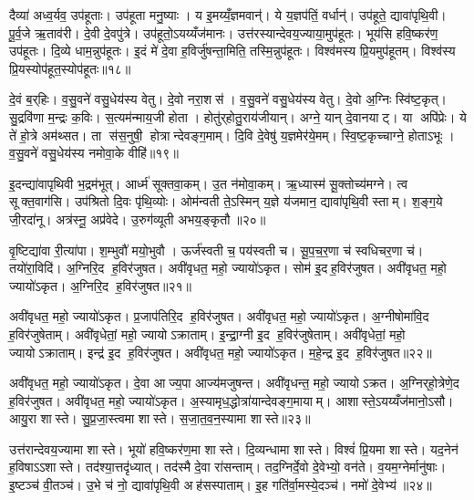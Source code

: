दैव्या॑ अध्व॒र्यव॒ उप॑हूताः। उप॑हूता मनु॒ष्याः। य इ॒मय्यँ॒ज्ञमवान्॑। ये य॒ज्ञप॑तिं॒ वर्धान्॑। उप॑हूते॒ द्यावा॑पृथि॒वी। पू॒र्व॒जे ऋ॒ताव॑री। दे॒वी दे॒वपु॑त्रे। उप॑हूतो॒ऽयय्यँज॑मानः। उत्त॑रस्यान्देवय॒ज्याया॒मुप॑हूतः। भूय॑सि हवि॒ष्कर॑ण॒ उप॑हूतः। दि॒व्ये धाम॒न्नुप॑हूतः। इ॒दं मे॑ दे॒वा ह॒विर्जु॑षन्ता॒मिति॒ तस्मि॒न्नुप॑हूतः। विश्व॑मस्य प्रि॒यमुप॑हूतम्। विश्व॑स्य प्रि॒यस्योप॑हूत॒स्योप॑हूतः॥१८॥\anuvakamend[स॒हर्‌ष॑भा ह्वयता॒मुप॑हूत हवि॒ष्कर॑ण॒ उप॑हूतश्च॒त्वारि॑ च]

दे॒वं ब॒र्‌हिः। व॒सु॒वने॑ वसु॒धेय॑स्य वेतु। दे॒वो नरा॒शस॑। व॒सु॒वने॑ वसु॒धेय॑स्य वेतु। दे॒वो अ॒ग्निः स्वि॑ष्ट॒कृत्। सु॒द्रवि॑णा म॒न्द्रः क॒विः। स॒त्यम॑न्माय॒जी होता। होतु॑र्‌होतु॒राय॑जीयान्। अग्ने॒ यान् दे॒वानयाट्। या अपि॑प्रेः। ये ते॑ हो॒त्रे अम॑थ्सत। ता स॑स॒नुषी॒ होत्रान्देवङ्ग॒माम्। दि॒वि दे॒वेषु॑ य॒ज्ञमेर॑ये॒मम्। स्वि॒ष्ट॒कृच्चाग्ने॒ होताऽभूः। व॒सु॒वने॑ वसु॒धेय॑स्य नमोवा॒के वीहि॑॥१९॥\anuvakamend[अपि॑प्रे॒ पञ्च॑ च]

इ॒दन्द्या॑वापृथिवी भ॒द्रम॑भूत्। आर्ध्म॑ सूक्तवा॒कम्। उ॒त न॑मोवा॒कम्। ऋ॒ध्यास्म॑ सू॒क्तोच्य॑मग्ने। त्व सूक्त॒वाग॑सि। उप॑श्रितो दि॒वः पृ॑थि॒व्योः। ओम॑न्वती ते॒ऽस्मिन् य॒ज्ञे य॑जमान॒ द्यावा॑पृथि॒वी स्ताम्। श॒ङ्ग॒ये जी॒रदा॑नू। अत्र॑स्नू॒ अप्र॑वेदे। उ॒रुग॑व्यूती अभय॒ङ्कृतौ॥२०॥

वृ॒ष्टिद्या॑वा री॒त्या॑पा। श॒म्भुवौ॑ मयो॒भुवौ। ऊर्ज॑स्वती च॒ पय॑स्वती च। सू॒प॒च॒र॒णा च॑ स्वधिचर॒णा च॑। तयो॑रा॒विदि॑। अ॒ग्निरि॒द ह॒विर॑जुषत। अवी॑वृधत॒ महो॒ ज्यायो॑ऽकृत। सोम॑ इ॒दह॒विर॑जुषत। अवी॑वृधत॒ महो॒ ज्यायो॑ऽकृत। अ॒ग्निरि॒द ह॒विर॑जुषत॥२१॥

अवी॑वृधत॒ महो॒ ज्यायो॑ऽकृत। प्र॒जाप॑तिरि॒द ह॒विर॑जुषत। अवी॑वृधत॒ महो॒ ज्यायो॑ऽकृत। अ॒ग्नीषोमा॑वि॒द ह॒विर॑जुषेताम्। अवी॑वृधेतां॒ महो॒ ज्यायोऽक्राताम्। इ॒न्द्रा॒ग्नी इ॒द ह॒विर॑जुषेताम्। अवी॑वृधेतां॒ महो॒ ज्यायोऽक्राताम्। इन्द्र॑ इ॒द ह॒विर॑जुषत। अवी॑वृधत॒ महो॒ ज्यायो॑ऽकृत। म॒हे॒न्द्र इ॒द ह॒विर॑जुषत॥२२॥

अवी॑वृधत॒ महो॒ ज्यायो॑ऽकृत। दे॒वा आज्य॒पा आज्य॑मजुषन्त। अवी॑वृधन्त॒ महो॒ ज्यायोऽक्रत। अ॒ग्निर्‌हो॒त्रेणे॒द ह॒विर॑जुषत। अवी॑वृधत॒ महो॒ ज्यायो॑ऽकृत। अ॒स्यामृध॒द्धोत्रा॑यान्देवङ्ग॒मायाम्। आशास्ते॒ऽयय्यँज॑मानो॒ऽसौ। आयु॒रा शास्ते। सु॒प्र॒जा॒स्त्वमा शास्ते। स॒जा॒त॒व॒न॒स्यामा शास्ते॥२३॥

उत्त॑रान्देवय॒ज्यामा शास्ते। भूयो॑ हवि॒ष्कर॑ण॒मा शास्ते। दि॒व्यन्धामा शास्ते। विश्वं॑ प्रि॒यमा शास्ते। यद॒नेन॑ ह॒विषाऽऽशास्ते। तद॑श्या॒त्तदृ॑ध्यात्। तद॑स्मै दे॒वा रा॑सन्ताम्। तद॒ग्निर्दे॒वो दे॒वेभ्यो॒ वन॑ते। व॒यम॒ग्नेर्मानु॑षाः। इ॒ष्टञ्च॑ वी॒तञ्च॑। उ॒भे च॑ नो॒ द्यावा॑पृथि॒वी अह॑सस्पाताम्। इ॒ह गति॑र्वा॒मस्ये॒दञ्च॑। नमो॑ दे॒वेभ्य॑॥२४॥\anuvakamend[अ॒भ॒य॒ङ्कृता॑वकृता॒ग्निरि॒द ह॒विर॑जुषत महे॒न्द्र इ॒द ह॒विर॑जुषत सजातवन॒स्यामा शास्ते वी॒तञ्च॒ त्रीणि॑ च]


